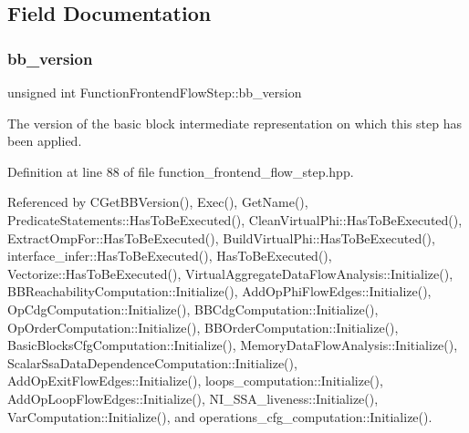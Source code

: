 \subsection{Field Documentation}
\mbox{\label{classFunctionFrontendFlowStep_a74f80c279317d4e73e0d84b4172ffeaa}} 
\subsubsection{\texorpdfstring{bb\+\_\+version}{bb\_version}}
{\footnotesize\ttfamily unsigned int Function\+Frontend\+Flow\+Step\+::bb\+\_\+version\hspace{0.3cm}{\ttfamily [protected]}}



The version of the basic block intermediate representation on which this step has been applied. 



Definition at line 88 of file function\+\_\+frontend\+\_\+flow\+\_\+step.\+hpp.



Referenced by C\+Get\+B\+B\+Version(), Exec(), Get\+Name(), Predicate\+Statements\+::\+Has\+To\+Be\+Executed(), Clean\+Virtual\+Phi\+::\+Has\+To\+Be\+Executed(), Extract\+Omp\+For\+::\+Has\+To\+Be\+Executed(), Build\+Virtual\+Phi\+::\+Has\+To\+Be\+Executed(), interface\+\_\+infer\+::\+Has\+To\+Be\+Executed(), Has\+To\+Be\+Executed(), Vectorize\+::\+Has\+To\+Be\+Executed(), Virtual\+Aggregate\+Data\+Flow\+Analysis\+::\+Initialize(), B\+B\+Reachability\+Computation\+::\+Initialize(), Add\+Op\+Phi\+Flow\+Edges\+::\+Initialize(), Op\+Cdg\+Computation\+::\+Initialize(), B\+B\+Cdg\+Computation\+::\+Initialize(), Op\+Order\+Computation\+::\+Initialize(), B\+B\+Order\+Computation\+::\+Initialize(), Basic\+Blocks\+Cfg\+Computation\+::\+Initialize(), Memory\+Data\+Flow\+Analysis\+::\+Initialize(), Scalar\+Ssa\+Data\+Dependence\+Computation\+::\+Initialize(), Add\+Op\+Exit\+Flow\+Edges\+::\+Initialize(), loops\+\_\+computation\+::\+Initialize(), Add\+Op\+Loop\+Flow\+Edges\+::\+Initialize(), N\+I\+\_\+\+S\+S\+A\+\_\+liveness\+::\+Initialize(), Var\+Computation\+::\+Initialize(), and operations\+\_\+cfg\+\_\+computation\+::\+Initialize().

\mbox{\label{classFunctionFrontendFlowStep_a0ba6ea352317faf2d378a900747fe340}} 
